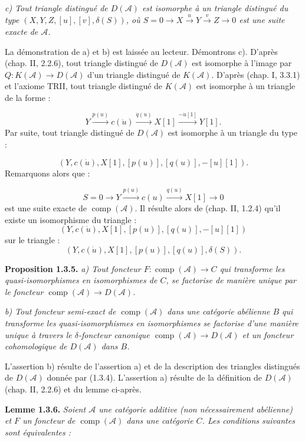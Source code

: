 \clearpage
{}%
\begingroup\small\setlength{\parskip}{0pt}\setlength{\emergencystretch}{1.5em}
\setlength{\abovedisplayskip}{4pt plus 2pt minus 2pt}%
\setlength{\belowdisplayskip}{4pt plus 2pt minus 2pt}%

\noindent\textit{c) Tout triangle distingué de $D(\mathcal A)$ est
isomorphe à un triangle distingué du type
$(X,Y,Z,[u],[v],\delta(S))$, où
$S=0\longrightarrow X\xrightarrow{u}Y\xrightarrow{v}Z\longrightarrow0$
est une suite exacte de $\mathcal A$.}

La démonstration de a) et b) est laissée au lecteur. Démontrons c). D'après
(chap. II, 2.2.6), tout triangle distingué de $D(\mathcal A)$ est isomorphe
à l'image par $Q\colon K(\mathcal A)\longrightarrow D(\mathcal A)$ d'un
triangle distingué de $K(\mathcal A)$. D'après (chap. I, 3.3.1) et l'axiome
TRII, tout triangle distingué de $K(\mathcal A)$ est isomorphe à un triangle
de la forme :

\[
Y\xrightarrow{\dot{p}(u)}c(\dot u)
\xrightarrow{\dot{q}(u)}X[1]
\xrightarrow{-\dot u[1]}Y[1].
\]
Par suite, tout triangle distingué de $D(\mathcal A)$ est isomorphe à un
triangle du type :

\[
(Y,c(\dot u),X[1],[p(u)],[q(u)],-[u][1]).
\]
Remarquons alors que :

\[
S=0\longrightarrow Y\xrightarrow{p(u)}c(u)
\xrightarrow{q(u)}X[1]\longrightarrow0
\]
est une suite exacte de $\operatorname{comp}(\mathcal A)$. Il résulte alors
de (chap. II, 1.2.4) qu'il existe un isomorphisme du triangle :
\[
(Y,c(\dot u),X[1],[p(u)],[q(u)],-[u][1])
\]
sur le triangle :
\[
(Y,c(\dot u),X[1],[p(u)],[q(u)],\delta(S)).
\]

\medskip\noindent\textbf{Proposition 1.3.5.}\quad
\textit{a) Tout foncteur
$F\colon\operatorname{comp}(\mathcal A)\longrightarrow C$ qui transforme
les quasi-isomorphismes en isomorphismes de $C$, se factorise de manière
unique par le foncteur
$\operatorname{comp}(\mathcal A)\longrightarrow D(\mathcal A)$.}

\noindent\textit{b) Tout foncteur semi-exact de
$\operatorname{comp}(\mathcal A)$ dans une catégorie abélienne $B$ qui
transforme les quasi-isomorphismes en isomorphismes se factorise d'une
manière unique à travers le $\delta$-foncteur canonique
$\operatorname{comp}(\mathcal A)\longrightarrow D(\mathcal A)$ et un
foncteur cohomologique de $D(\mathcal A)$ dans $B$.}

L'assertion b) résulte de l'assertion a) et de la description des triangles
distingués de $D(\mathcal A)$ donnée par (1.3.4). L'assertion a) résulte de
la définition de $D(\mathcal A)$ (chap. II, 2.2.6) et du lemme ci-après.

\medskip\noindent\textbf{Lemme 1.3.6.}\quad
\textit{Soient $\mathcal A$ une catégorie additive (non nécessairement
abélienne) et $F$ un foncteur de $\operatorname{comp}(\mathcal A)$ dans
une catégorie $C$. Les conditions suivantes sont équivalentes :}
\endgroup
